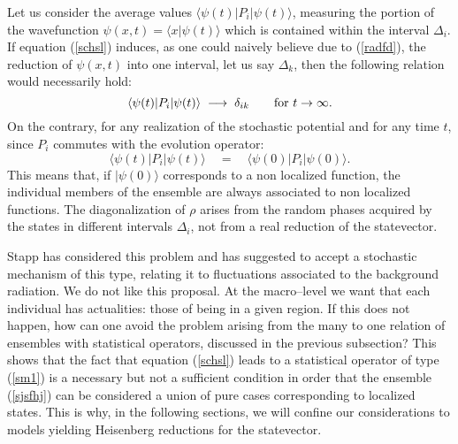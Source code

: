 \documentclass[10pt,a4paper]{article}
\begin{document}
Let us consider the average values $\langle \psi(t)| P_{i}
|\psi(t)\rangle$, measuring the portion of the wavefunction
$\psi(x, t) = \langle x|\psi(t)\rangle$ which is contained within
the interval $\Delta_{i}$. If equation (\ref{schsl}) induces, as
one could naively believe due to (\ref{radfd}), the reduction of
$\psi(x,t)$ into one interval, let us say $\Delta_{k}$, then the
following relation would necessarily hold:
\begin{equation}
\langle \psi(t)| P_{i} |\psi(t)\rangle \; \longrightarrow \;
\delta_{ik} \qquad \makebox{for $t \rightarrow \infty$}.
\end{equation}
On the contrary, for any realization of the stochastic potential
and for any time $t$, since $P_{i}$ commutes with the evolution operator:
\begin{equation}
\langle \psi(t)| P_{i} |\psi(t)\rangle \quad = \quad \langle
\psi(0)| P_{i} |\psi(0)\rangle.
\end{equation}
This means that, if $|\psi(0)\rangle$ corresponds to a non
localized function, the individual members of the ensemble are
always associated to non localized functions. The diagonalization
of $\rho$ arises from the random phases acquired by the states in
different intervals $\Delta_{i}$, not from a real reduction of the
statevector.

Stapp \cite{std} has considered this problem and has suggested to
accept a stochastic mechanism of this type, relating it to
fluctuations associated to the background radiation. We do not
like this proposal. At the macro--level we want that each
individual has actualities: those of being in a given region. If
this does not happen, how can one avoid the problem arising from
the many to one relation of ensembles with statistical operators,
discussed in the previous subsection? This shows that the fact
that equation (\ref{schsl}) leads to a statistical operator of
type (\ref{sm1}) is a necessary but not a sufficient condition in
order that the ensemble (\ref{sjsfhj}) can be considered a union
of pure cases corresponding to localized states. This is why, in
the following sections, we will confine our considerations to
models yielding Heisenberg reductions for the statevector.
\end{document}
